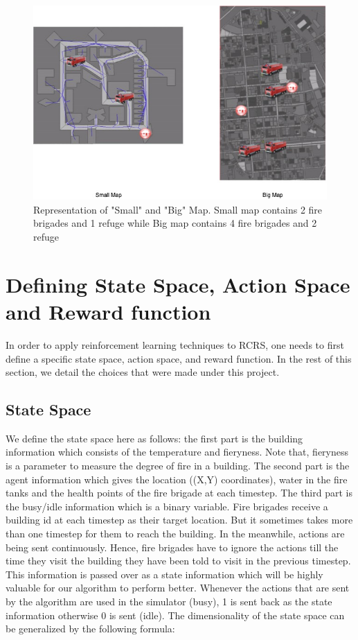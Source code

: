 \documentclass[12pt]{report}
\begin{document}
\begin{figure}[!h]
    \centering
    \includegraphics[width=15cm]{SmallBigMap.jpg}
    \caption{Representation of "Small" and "Big" Map. Small map contains 2 fire brigades and 1 refuge while Big map contains 4 fire brigades and 2 refuge}
    \label{fig:BigMap}
\end{figure}


\section{Defining State Space, Action Space and Reward function}

In order to apply reinforcement learning techniques to RCRS, one needs to first define a specific state space, action space, and reward function. In the rest of this section, we detail the choices that were made under this project. 

\subsection{State Space}
    
We define the state space here as follows: the first part is the building information which consists of the temperature and fieryness. Note that, fieryness is a parameter to measure the degree of fire in a building. The second part is the agent information which gives the location ((X,Y) coordinates), water in the fire tanks and the health points of the fire brigade at each timestep. The third part is the busy/idle information which is a binary variable. Fire brigades receive a building id at each timestep as their target location. But it sometimes takes more than one timestep for them to reach the building. In the meanwhile, actions are being sent continuously. Hence, fire brigades have to ignore the actions till the time they visit the building they have been told to visit in the previous timestep. This information is passed over as a state information which will be highly valuable for our algorithm to perform better. Whenever the actions that are sent by the algorithm are used in the simulator (busy), 1 is sent back as the state information otherwise 0 is sent (idle). The dimensionality of the state space can be generalized by the following formula: 
\end{document}
